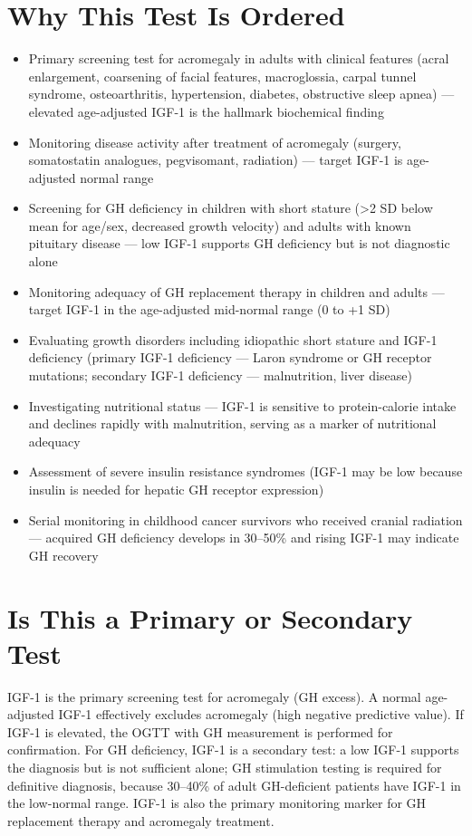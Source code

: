 \section*{Why This Test Is Ordered}
\begin{itemize}
  \item Primary screening test for acromegaly in adults with clinical features (acral enlargement, coarsening of facial features, macroglossia, carpal tunnel syndrome, osteoarthritis, hypertension, diabetes, obstructive sleep apnea) --- elevated age-adjusted IGF-1 is the hallmark biochemical finding
  \item Monitoring disease activity after treatment of acromegaly (surgery, somatostatin analogues, pegvisomant, radiation) --- target IGF-1 is age-adjusted normal range
  \item Screening for GH deficiency in children with short stature (>2 SD below mean for age/sex, decreased growth velocity) and adults with known pituitary disease --- low IGF-1 supports GH deficiency but is not diagnostic alone
  \item Monitoring adequacy of GH replacement therapy in children and adults --- target IGF-1 in the age-adjusted mid-normal range (0 to +1 SD)
  \item Evaluating growth disorders including idiopathic short stature and IGF-1 deficiency (primary IGF-1 deficiency --- Laron syndrome or GH receptor mutations; secondary IGF-1 deficiency --- malnutrition, liver disease)
  \item Investigating nutritional status --- IGF-1 is sensitive to protein-calorie intake and declines rapidly with malnutrition, serving as a marker of nutritional adequacy
  \item Assessment of severe insulin resistance syndromes (IGF-1 may be low because insulin is needed for hepatic GH receptor expression)
  \item Serial monitoring in childhood cancer survivors who received cranial radiation --- acquired GH deficiency develops in 30--50\% and rising IGF-1 may indicate GH recovery
\end{itemize}

\section*{Is This a Primary or Secondary Test}
IGF-1 is the primary screening test for acromegaly (GH excess). A normal age-adjusted IGF-1 effectively excludes acromegaly (high negative predictive value). If IGF-1 is elevated, the OGTT with GH measurement is performed for confirmation. For GH deficiency, IGF-1 is a secondary test: a low IGF-1 supports the diagnosis but is not sufficient alone; GH stimulation testing is required for definitive diagnosis, because 30--40\% of adult GH-deficient patients have IGF-1 in the low-normal range. IGF-1 is also the primary monitoring marker for GH replacement therapy and acromegaly treatment.

